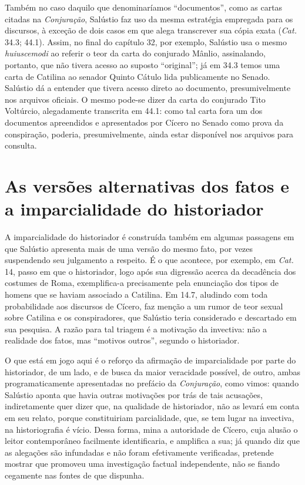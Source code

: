  Também no caso daquilo que denominaríamos  “documentos”, como as cartas
 citadas na \emph{Conjuração}, Salústio faz uso da mesma estratégia empregada
 para os discursos, à exceção de dois casos em que alega transcrever
 sua cópia exata (\emph{Cat.} 34.3; 44.1). Assim, no final do capítulo 32, por exemplo, Salústio usa o mesmo 
\emph{huiuscemodi} ao referir o teor da carta do conjurado Mânlio, assinalando, portanto, que não tivera acesso ao suposto ``original''; já em 34.3 temos uma carta de Catilina ao senador Quinto Cátulo lida publicamente no Senado. Salústio dá a entender que tivera acesso direto ao documento, presumivelmente nos arquivos oficiais. O mesmo pode-se dizer da carta do conjurado Tito Voltúrcio, alegadamente transcrita em 44.1: como tal carta fora um dos documentos apreendidos e apresentados por Cícero no Senado como prova da conspiração, poderia, presumivelmente, ainda estar disponível nos arquivos para consulta. 

 

\section{As versões alternativas dos fatos e  a imparcialidade do historiador}

 A imparcialidade do historiador é construída também em algumas passagens em
 que Salústio apresenta mais de uma versão do mesmo fato, por vezes suspendendo
 seu julgamento a respeito. É o que acontece, por exemplo, em \emph{Cat.} 14, passo em
 que o historiador, logo após sua digressão acerca da decadência dos costumes
 de Roma, exemplifica-a precisamente pela enunciação dos tipos de homens que se
 haviam associado a Catilina. Em 14.7, aludindo com toda probabilidade aos discursos de 
 Cícero, faz menção a um rumor de teor sexual sobre Catilina e os conspiradores, que Salústio teria considerado e
 descartado em sua pesquisa. A razão para tal triagem é a motivação da invectiva: não a realidade dos fatos, mas ``motivos outros'', segundo o historiador. 
 
 O que está em jogo aqui é o reforço da afirmação de
 imparcialidade por parte do historiador, de um lado, e de busca da maior
 veracidade possível, de outro, ambas programaticamente apresentadas no
 prefácio da \emph{Conjuração}, como vimos: quando Salústio aponta que havia
 outras motivações por trás de tais acusações, indiretamente quer dizer que, na
 qualidade de historiador, não as levará em conta em seu relato, porque
 constituiriam parcialidade, que, se tem lugar na invectiva, na historiografia
 é vício. 
 Dessa forma, mina a autoridade
 de Cícero, cuja alusão o leitor contemporâneo facilmente identificaria, e
 amplifica a sua; já quando diz que as alegações são infundadas e não foram
 efetivamente verificadas, pretende mostrar que promoveu uma investigação
 factual independente, não se fiando cegamente nas fontes de que dispunha.
 

